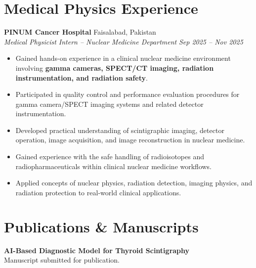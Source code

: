 \documentclass[10.5pt,a4paper]{article}
\begin{document}

\section{Medical Physics Experience}

\textbf{PINUM Cancer Hospital}
\hfill Faisalabad, Pakistan\\
\textit{Medical Physicist Intern -- Nuclear Medicine Department}
\hfill \textit{Sep 2025 -- Nov 2025}

\begin{itemize}

    \item Gained hands-on experience in a clinical nuclear medicine
    environment involving \textbf{gamma cameras, SPECT/CT imaging,
    radiation instrumentation, and radiation safety}.

    \item Participated in quality control and performance evaluation
    procedures for gamma camera/SPECT imaging systems and related detector
    instrumentation.

    \item Developed practical understanding of scintigraphic imaging,
    detector operation, image acquisition, and image reconstruction in
    nuclear medicine.

    \item Gained experience with the safe handling of radioisotopes and
    radiopharmaceuticals within clinical nuclear medicine workflows.

    \item Applied concepts of nuclear physics, radiation detection,
    imaging physics, and radiation protection to real-world clinical
    applications.

\end{itemize}



\section{Publications \& Manuscripts}

\textbf{AI-Based Diagnostic Model for Thyroid Scintigraphy}\\
Manuscript submitted for publication.
\end{document}
